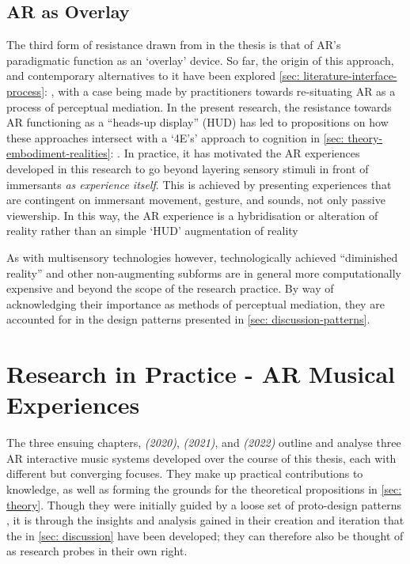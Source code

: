 \subsection{AR as Overlay} \label{sec: method-resistance-overlay}
The third form of resistance drawn from in the thesis is that of AR's paradigmatic function as an `overlay' device. 
So far, the origin of this approach, and contemporary alternatives to it have been explored \autoref{sec: literature-interface-process}: , with a case being made by practitioners \citep{mann1994,schraffenberger2018,chevalier2020} towards re-situating AR as a process of perceptual mediation. In the present research, the resistance towards AR functioning as a ``heads-up display'' (HUD) has led to propositions on how these approaches intersect with a `4E's' approach to cognition in \autoref{sec: theory-embodiment-realities}: . In practice, it has motivated the AR experiences developed in this research to go beyond layering sensory stimuli in front of immersants \textit{as experience itself}. This is achieved by presenting experiences that are contingent on immersant movement, gesture, and sounds, not only passive viewership. In this way, the AR experience is a hybridisation or alteration of reality rather than an simple `HUD' augmentation of reality

As with multisensory technologies however, technologically achieved ``diminished reality'' and other non-augmenting subforms are in general more computationally expensive and beyond the scope of the research practice. By way of acknowledging their importance as methods of perceptual mediation, they are accounted for in the design patterns presented in \autoref{sec: discussion-patterns}.



\section{Research in Practice - AR Musical Experiences}
The three ensuing chapters, \textit{ (2020)}, \textit{ (2021)}, and \textit{ (2022)} outline and analyse three AR interactive music systems developed over the course of this thesis, each with different but converging focuses. They make up practical contributions to knowledge, as well as forming the grounds for the theoretical propositions in \autoref{sec: theory}. Though they were initially guided by a loose set of proto-design patterns \citep{bilbow2020a}, it is through the insights and analysis gained in their creation and iteration that the  in \autoref{sec: discussion} have been developed; they can therefore also be thought of as research probes in their own right.

